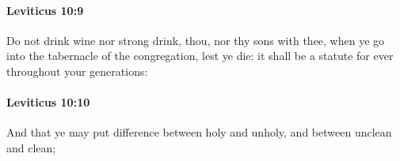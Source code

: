 		\paragraph{Leviticus 10:9} %
			\label{LEVITICUS-10-9}

			Do not drink wine nor strong drink, thou, nor thy sons with thee, when ye go into the tabernacle of the congregation, lest ye die: it shall be a statute for ever throughout your generations:


		\paragraph{Leviticus 10:10} %
			\label{LEVITICUS-10-10}

			And that ye may put difference between holy and unholy, and between unclean and clean;


